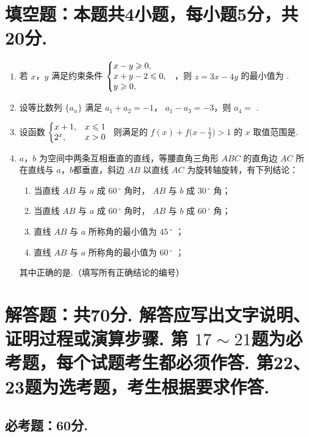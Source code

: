 \documentclass[12pt,space]{ctexart} %
\begin{document}
\section{填空题：本题共4小题，每小题5分，共20分. }
\begin{enumerate}[itemsep=-0.3em,topsep=0pt,resume]%
\item  若 $x$，$y$ 满足约束条件 $\left\{\begin{array}{@{}l}
x-y\geqslant0,\\x+y-2\leqslant0,\\y\geqslant0,
\end{array}\right.$
，则 $z=3x-4y$ 的最小值为 .

\item 设等比数列 $\{a_n\}$ 满足 $a_1+a_2=-1$， $a_1 - a_3=-3$，则 $a_4=$ .

\item 设函数 $\biggl\lbrace\begin{array}{@{}ll}
x+1,&x\leqslant1\\2^x,&x>0
\end{array}$ 则满足的 $f(x)+f\big(x-\tfrac{1}{2}\big)>1$ 的 $x$ 取值范围是.
\item $a$，$b$ 为空间中两条互相垂直的直线，等腰直角三角形 $ABC$ 的直角边 $AC$ 所在直线与 $a$，$b$都垂直，斜边 $AB$ 以直线 $AC$ 为旋转轴旋转，有下列结论：
\begin{enumerate}[align=left,labelsep=-0.6em,leftmargin=1.2em,noitemsep,topsep=0pt]
	\item[\ding{172}] 当直线 $AB$ 与 $a$ 成 $60\,^{\circ}$ 角时， $AB$ 与 $b$ 成 $30\,^{\circ}$ 角；
	\item[\ding{173}] 当直线 $AB$ 与 $a$ 成 $60\,^{\circ}$ 角时， $AB$ 与 $b$ 成 $60\,^{\circ}$ 角；
	\item[\ding{174}] 直线 $AB$ 与 $a$ 所称角的最小值为 $45\,^{\circ}$ ；
	\item[\ding{175}] 直线 $AB$ 与 $a$ 所称角的最小值为 $60\,^{\circ}$ ；
\end{enumerate}
其中正确的是.（填写所有正确结论的编号）
\end{enumerate}

\section{解答题：共70分. 解答应写出文字说明、证明过程或演算步骤. 第 $17\sim21$题为必考题，每个试题考生都必须作答. 第22、23题为选考题，考生根据要求作答. }
\subsection{必考题：60分. }
\end{document}
